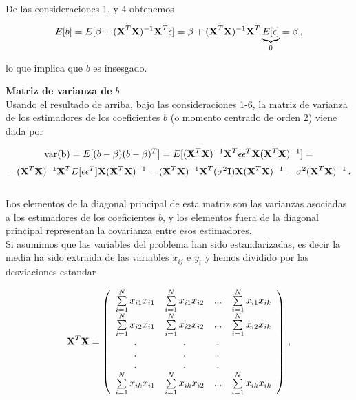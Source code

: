 \documentclass[
]{agujournal2019}
\begin{document}
De las consideraciones 1, y 4 obtenemos

\[E[b]=E[\beta + ({\textbf X}^T{\textbf X})^{-1}{\textbf X}^T\epsilon]=
  \beta + ({\textbf X}^T{\textbf X})^{-1}{\textbf X}^T \underbrace{E[\epsilon]}_{0}=\beta\,,\]

lo que implica que \(b\) es insesgado.

\vspace{0.5cm}

\textbf{Matriz de varianza de} \(b\)\\

Usando el resultado de arriba, bajo las consideraciones 1-6, la matriz
de varianza de los estimadores de los coeficientes \(b\) (o momento
centrado de orden 2) viene dada por

\[{\rm var(b)}=E[(b-\beta)(b-\beta)^T]=E[({\textbf X}^T{\textbf X})^{-1}{\textbf X}^T\epsilon \epsilon^T{\textbf X}
    ({\textbf X}^T{\textbf X})^{-1}]=\]
\[=({\textbf X}^T{\textbf X})^{-1}{\textbf X}^T E[\epsilon \epsilon^T]{\textbf X}({\textbf X}^T{\textbf X})^{-1}=
    ({\textbf X}^T{\textbf X})^{-1}{\textbf X}^T(\sigma^2{\textbf I}){\textbf X}({\textbf X}^T{\textbf X})^{-1}=
    \sigma^2({\textbf X}^T{\textbf X})^{-1}\,.\]\\

Los elementos de la diagonal principal de esta matriz son las varianzas
asociadas a los estimadores de los coeficientes \(b\), y los elementos
fuera de la diagonal principal representan la covarianza entre esos
estimadores.\\
Si asumimos que las variables del problema han sido estandarizadas, es
decir la media ha sido extraida de las variables \(x_{ij}\) e \(y_i\) y
hemos dividido por las desviaciones estandar

\[{\textbf X}^T{\textbf X}=\left(\begin{array}{cccc}
   \sum\limits_{i=1}^N{x_{i1}x_{i1}} & \sum\limits_{i=1}^N{x_{i1}x_{i2}} & ... & \sum\limits_{i=1}^N{x_{i1}x_{ik}}\\
   \sum\limits_{i=1}^N{x_{i2}x_{i1}} & \sum\limits_{i=1}^N{x_{i2}x_{i2}} & ... & \sum\limits_{i=1}^N{x_{i2}x_{ik}}\\
        . & . & . \\
        . & . & . \\
        . & . & . \\
   \sum\limits_{i=1}^N{x_{ik}x_{i1}} & \sum\limits_{i=1}^N{x_{ik}x_{i2}} & ... & \sum\limits_{i=1}^N{x_{ik}x_{ik}}\\
        \end{array}\right)\,,\]
\end{document}
